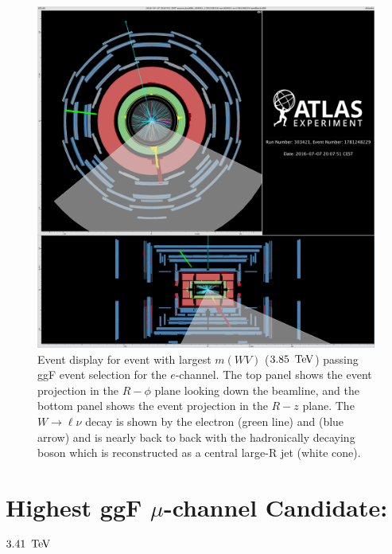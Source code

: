 \begin{figure}[h!tbp]
\begin{center}
\includegraphics[width=\linewidth]{figures/Appendix/highest_e_candidate}
\caption[Event display for highest mass candidate (gluon-gluon fusion selection, $e$-channel)]{Event display for event with largest $m(WV)$ ($3.85\,\TeV$) passing ggF event selection for the $e$-channel. The top panel shows the event projection in the $R-\phi$ plane looking down the beamline, and the bottom panel shows the event projection in the $R-z$ plane. The $W\rightarrow \ell\nu$ decay is shown by the electron (green line) and \MET (blue arrow) and is nearly back to back with the hadronically decaying boson which is reconstructed as a central large-R jet (white cone).}
\end{center}
\label{fig:ggf_e_ed}
\end{figure}

\clearpage
\section{Highest ggF $\mu$-channel Candidate: $3.41\,\TeV$}
\label{sec:high_ggf_m}

